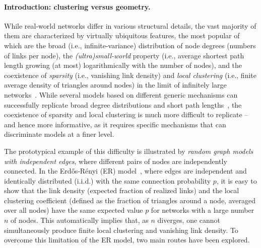 \documentclass[ twocolumn,
 amsmath,amssymb,
 aps, pre, amsthm, amsfonts,
]{revtex4-2}
\begin{document}
\maketitle


\paragraph*{Introduction: clustering versus geometry.}

While real-world networks differ in various structural details, the vast majority of them are characterized by virtually ubiquitous features, the most popular of which are the broad (i.e., infinite-variance) distribution of node degrees (numbers of links per node), the \emph{(ultra)small-world} property (i.e., average shortest path length growing (at most) logarithmically with the number of nodes), and the coexistence of \emph{sparsity} (i.e., vanishing link density) and \emph{local clustering} (i.e., finite average density of triangles around nodes) in the limit of infinitely large networks~\cite{caldarelli2007scale,newman2018networks}. 
While several models based on different generic mechanisms can successfully replicate broad degree distributions and short path lengths~\cite{newman2018networks,van2016random}, the coexistence of sparsity and local clustering is much more difficult to replicate -- and hence more informative, as it requires specific mechanisms that can discriminate models at a finer level. 

The prototypical example of this difficulty is illustrated by \emph{random graph models with independent edges}, where different pairs of nodes are independently connected.
In the Erd\H{o}s-R\'enyi (ER) model~\cite{erdHos1960evolution}, where edges are independent and identically distributed (i.i.d.) with the same connection probability $p$, it is easy to show that the link density (expected fraction of realized links) and the local clustering coefficient (defined as the fraction of triangles around a node, averaged over all nodes) have the same expected value $p$ for networks with a large number $n$ of nodes. 
This automatically implies that, as $n$ diverges, one cannot simultaneously produce finite local clustering and vanishing link density. 
To overcome this limitation of the ER model, 
two main routes have been explored. 
\end{document}
